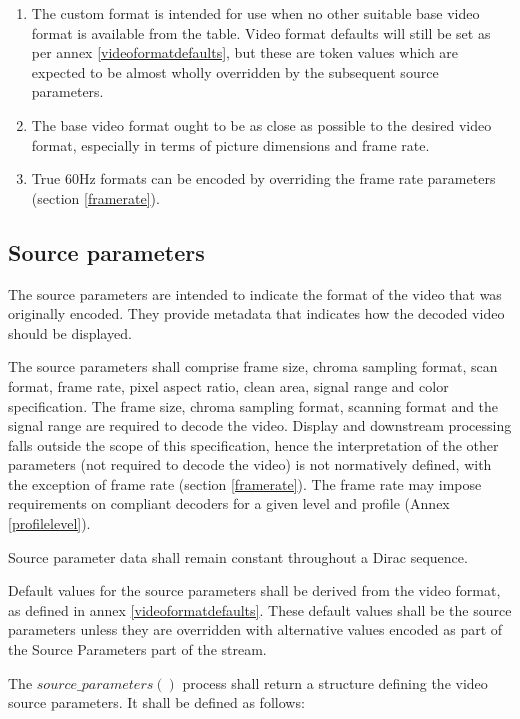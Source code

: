 \begin{informative}
\begin{enumerate}
\item The custom format is intended for use when no other suitable base video 
format is available from the table. Video format defaults will still be set as 
per annex \ref{videoformatdefaults}, but these are token values which are expected 
to be almost wholly overridden by the subsequent source parameters. 
\item The base video format ought to be as close as possible to the desired video
format, especially in terms of picture dimensions and frame rate.
\item True 60Hz formats can be encoded by overriding the frame rate parameters
(section \ref{framerate}).
 \end{enumerate}
\end{informative}

\subsection{Source parameters}
\label{sourceparameters}

The source parameters are intended to indicate the format of the video that was 
originally encoded. They provide metadata that indicates how the decoded video
should be displayed. 

The source parameters shall comprise frame size, chroma sampling format, 
scan format, frame rate, pixel aspect ratio, clean area, signal range 
and color specification. The frame size, chroma sampling  format, 
scanning format and the signal range are required to decode the video. Display 
and downstream processing falls outside the scope of this specification, 
hence the interpretation of the other parameters (not required to decode 
the video) is not normatively defined, with the exception of frame rate 
(section \ref{framerate}). The frame rate may impose requirements on
 compliant decoders for a given level and profile (Annex \ref{profilelevel}).

Source parameter data shall remain constant throughout a Dirac sequence. 

Default values for the source parameters shall be derived from the video 
format, as defined in annex \ref{videoformatdefaults}. These default 
values shall be the source parameters unless they are overridden 
with alternative values encoded 
as part of the Source Parameters part of the stream. 

The $source\_parameters()$ process shall return a structure defining 
the video source parameters. It shall be defined as follows:

